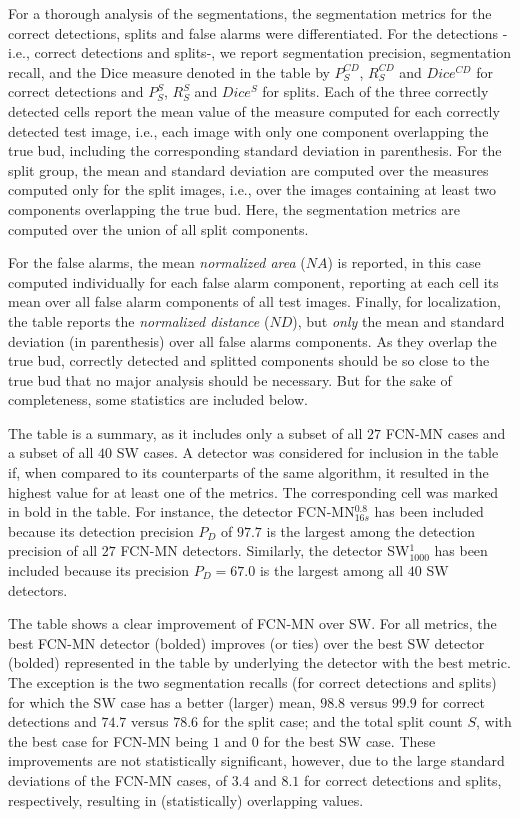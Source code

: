 \documentclass[a4paper,authoryear,review]{elsarticle}
\begin{document}
For a thorough analysis of the segmentations, the segmentation metrics for the correct detections, splits and false alarms were differentiated. For the detections -i.e., correct detections and splits-, we report segmentation precision, segmentation recall, and the Dice measure denoted in the table by $P_S^{CD}$, $R_S^{CD}$ and $Dice^{CD}$ for correct detections and $P_S^S$, $R_S^S$ and $Dice^S$ for splits.  Each of the three correctly detected cells report the mean value of the measure computed for each correctly detected test image, i.e., each image with only one component overlapping the true bud, including the corresponding standard deviation  in parenthesis. For the split group, the mean and standard deviation are computed over the measures computed only for the split images, i.e., over the images containing at least two components overlapping the true bud. Here, the segmentation metrics are computed over the union of all split components. 

For the false alarms, the mean \emph{normalized area} ($NA$) is reported, in this case computed individually for each false alarm component, reporting at each cell its mean over all false alarm components of all test images. Finally, for localization, the table reports the \emph{normalized distance} ($ND$), but \emph{only} the mean and standard deviation (in parenthesis) over all false alarms components. As they overlap the true bud, correctly detected and splitted components should be so close to the true bud that no major analysis should be necessary. But for the sake of completeness,  some statistics are included below. 
%

The table is a summary, as it includes only a subset of all $27$ FCN-MN cases and a subset of all $40$ SW cases. A detector was considered for inclusion in the table if, when compared to its counterparts of the same algorithm, it resulted in the highest value for at least one of the metrics. The corresponding cell was marked in bold in the table. For instance, the detector FCN-MN$_{16s}^{0.8}$ has been included because its detection precision $P_D$ of $97.7$ is the largest among the detection precision of all $27$ FCN-MN detectors. Similarly, the detector SW$_{1000}^1$ has been included because its precision $P_D = 67.0$ is the largest among all $40$ SW detectors. 

The table shows a clear improvement of FCN-MN over SW. For all metrics, the best  FCN-MN detector (bolded) improves (or ties) over the best SW detector (bolded) represented in the table by underlying the detector with the best metric. The exception is the two segmentation recalls (for correct detections and splits) for which the SW case has a better (larger) mean, $98.8$ versus $99.9$ for correct detections and $74.7$ versus $78.6$ for the split case; and the total split count $S$, with the best case for FCN-MN being $1$ and $0$ for the best SW case. These improvements are not statistically significant, however, due to the large standard deviations of the FCN-MN cases, of $3.4$ and $8.1$ for correct detections and splits, respectively,  resulting in (statistically) overlapping values. 
\end{document}
